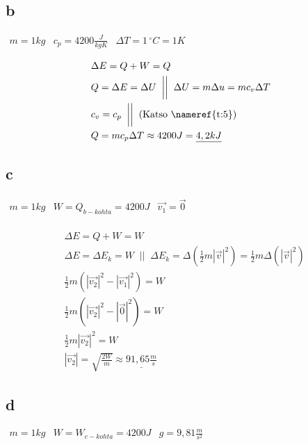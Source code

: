 \documentclass[12pt,a4paper,finnish]{article}
\begin{document}
\subsection{b}

\begin{math}
 \begin{array}{lll}
  m = 1 kg & c_p = 4200 \frac{J}{kgK} & \Delta T = 1\,^{\circ}C = 1 K
 \end{array}
\end{math}

\begin{align}
 &\Delta E = Q + W = Q\\
 &Q = \Delta E = \Delta U  \;\;\bigg|\bigg|\;\;  \Delta U = m\Delta u = mc_v\Delta T\\
 &c_v = c_p \;\;\bigg|\bigg|\;\; \text{(Katso \nameref{t:5})}\\
 &Q = mc_p\Delta T \approx 4200 J = \underline{4,2 kJ}
\end{align}

\subsection{c}

\begin{math}
 \begin{array}{lll}
  m = 1 kg & W = Q_{b-kohta} = 4200 J & \vec{v_1} = \vec{0}\\
 \end{array}
\end{math}

\begin{align}
 &\Delta E = Q + W = W\\
 &\Delta E = \Delta E_k = W \;\;\bigg|\bigg|\;\; 
 \Delta E_k = \Delta \left(\frac{1}{2}m|\vec{v}|^2\right) = \frac{1}{2}m\Delta\left(|\vec{v}|^2\right)\\
 &\frac{1}{2}m\left(|\vec{v_2}|^2 -|\vec{v_1}|^2\right) = W\\
 &\frac{1}{2}m\left(|\vec{v_2}|^2 -|\vec{0}|^2\right)
  = W\\
 &\frac{1}{2}m|\vec{v_2}|^2= W\\
 &|\vec{v_2}| = \sqrt{\frac{2W}{m}} \approx \underline{91,65 \frac{m}{s}}
\end{align}

\subsection{d}

\begin{math}
 \begin{array}{lll}
  m = 1 kg & W = W_{c-kohta} = 4200 J & g = 9,81 \frac{m}{s^2}
 \end{array}
\end{math}
\end{document}
